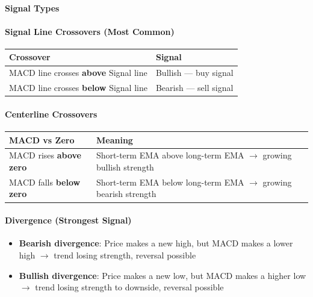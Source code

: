 \documentclass[12pt,openany]{book}
\begin{document}
\paragraph{Signal Types}

\paragraph{Signal Line Crossovers (Most Common)}

\begin{center}
\small
\renewcommand{\arraystretch}{1.2}
\begin{tabular}{|L{0.30\textwidth}|L{0.60\textwidth}|}
\hline
 \textbf{Crossover} & \textbf{Signal} \\ \hline
 MACD line crosses \textbf{above} Signal line & Bullish --- buy signal \\ \hline
 MACD line crosses \textbf{below} Signal line & Bearish --- sell signal \\ \hline
\end{tabular}
\end{center}

\paragraph{Centerline Crossovers}

\begin{center}
\small
\renewcommand{\arraystretch}{1.2}
\begin{tabular}{|L{0.30\textwidth}|L{0.60\textwidth}|}
\hline
 \textbf{MACD vs Zero} & \textbf{Meaning} \\ \hline
 MACD rises \textbf{above zero} & Short-term EMA above long-term EMA \(\rightarrow\) growing bullish strength \\ \hline
 MACD falls \textbf{below zero} & Short-term EMA below long-term EMA \(\rightarrow\) growing bearish strength \\ \hline
\end{tabular}
\end{center}

\paragraph{Divergence (Strongest Signal)}
\begin{itemize}[leftmargin=*]
    \item \textbf{Bearish divergence}: Price makes a new high, but MACD makes a lower high \(\rightarrow\) trend losing strength, reversal possible
    \item \textbf{Bullish divergence}: Price makes a new low, but MACD makes a higher low \(\rightarrow\) trend losing strength to downside, reversal possible
\end{itemize}
\end{document}
